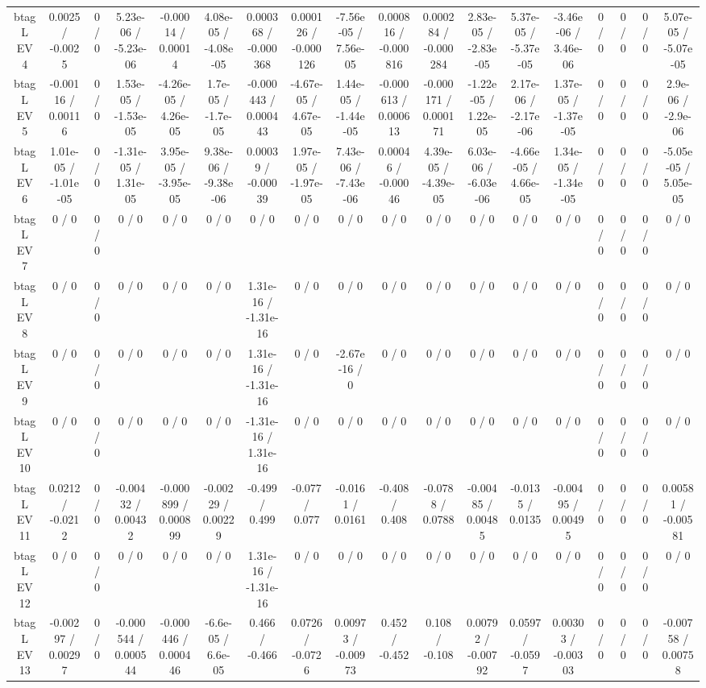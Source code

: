 \documentclass[10pt]{article}
\begin{document}
\begin{table}[htbp]
\begin{center}
\begin{tabular}{|c|c|c|c|c|c|c|c|c|c|c|c|c|c|c|c|c|c|}
  btag L EV 4 & 0.0025 / -0.0025 & 0 / 0 & 5.23e-06 / -5.23e-06 & -0.00014 / 0.00014 & 4.08e-05 / -4.08e-05 & 0.000368 / -0.000368 & 0.000126 / -0.000126 & -7.56e-05 / 7.56e-05 & 0.000816 / -0.000816 & 0.000284 / -0.000284 & 2.83e-05 / -2.83e-05 & 5.37e-05 / -5.37e-05 & -3.46e-06 / 3.46e-06 & 0 / 0 & 0 / 0 & 0 / 0 & 5.07e-05 / -5.07e-05 \\ 
  btag L EV 5 & -0.00116 / 0.00116 & 0 / 0 & 1.53e-05 / -1.53e-05 & -4.26e-05 / 4.26e-05 & 1.7e-05 / -1.7e-05 & -0.000443 / 0.000443 & -4.67e-05 / 4.67e-05 & 1.44e-05 / -1.44e-05 & -0.000613 / 0.000613 & -0.000171 / 0.000171 & -1.22e-05 / 1.22e-05 & 2.17e-06 / -2.17e-06 & 1.37e-05 / -1.37e-05 & 0 / 0 & 0 / 0 & 0 / 0 & 2.9e-06 / -2.9e-06 \\ 
  btag L EV 6 & 1.01e-05 / -1.01e-05 & 0 / 0 & -1.31e-05 / 1.31e-05 & 3.95e-05 / -3.95e-05 & 9.38e-06 / -9.38e-06 & 0.00039 / -0.00039 & 1.97e-05 / -1.97e-05 & 7.43e-06 / -7.43e-06 & 0.00046 / -0.00046 & 4.39e-05 / -4.39e-05 & 6.03e-06 / -6.03e-06 & -4.66e-05 / 4.66e-05 & 1.34e-05 / -1.34e-05 & 0 / 0 & 0 / 0 & 0 / 0 & -5.05e-05 / 5.05e-05 \\ 
  btag L EV 7 & 0 / 0 & 0 / 0 & 0 / 0 & 0 / 0 & 0 / 0 & 0 / 0 & 0 / 0 & 0 / 0 & 0 / 0 & 0 / 0 & 0 / 0 & 0 / 0 & 0 / 0 & 0 / 0 & 0 / 0 & 0 / 0 & 0 / 0 \\ 
  btag L EV 8 & 0 / 0 & 0 / 0 & 0 / 0 & 0 / 0 & 0 / 0 & 1.31e-16 / -1.31e-16 & 0 / 0 & 0 / 0 & 0 / 0 & 0 / 0 & 0 / 0 & 0 / 0 & 0 / 0 & 0 / 0 & 0 / 0 & 0 / 0 & 0 / 0 \\ 
  btag L EV 9 & 0 / 0 & 0 / 0 & 0 / 0 & 0 / 0 & 0 / 0 & 1.31e-16 / -1.31e-16 & 0 / 0 & -2.67e-16 / 0 & 0 / 0 & 0 / 0 & 0 / 0 & 0 / 0 & 0 / 0 & 0 / 0 & 0 / 0 & 0 / 0 & 0 / 0 \\ 
  btag L EV 10 & 0 / 0 & 0 / 0 & 0 / 0 & 0 / 0 & 0 / 0 & -1.31e-16 / 1.31e-16 & 0 / 0 & 0 / 0 & 0 / 0 & 0 / 0 & 0 / 0 & 0 / 0 & 0 / 0 & 0 / 0 & 0 / 0 & 0 / 0 & 0 / 0 \\ 
  btag L EV 11 & 0.0212 / -0.0212 & 0 / 0 & -0.00432 / 0.00432 & -0.000899 / 0.000899 & -0.00229 / 0.00229 & -0.499 / 0.499 & -0.077 / 0.077 & -0.0161 / 0.0161 & -0.408 / 0.408 & -0.0788 / 0.0788 & -0.00485 / 0.00485 & -0.0135 / 0.0135 & -0.00495 / 0.00495 & 0 / 0 & 0 / 0 & 0 / 0 & 0.00581 / -0.00581 \\ 
  btag L EV 12 & 0 / 0 & 0 / 0 & 0 / 0 & 0 / 0 & 0 / 0 & 1.31e-16 / -1.31e-16 & 0 / 0 & 0 / 0 & 0 / 0 & 0 / 0 & 0 / 0 & 0 / 0 & 0 / 0 & 0 / 0 & 0 / 0 & 0 / 0 & 0 / 0 \\ 
  btag L EV 13 & -0.00297 / 0.00297 & 0 / 0 & -0.000544 / 0.000544 & -0.000446 / 0.000446 & -6.6e-05 / 6.6e-05 & 0.466 / -0.466 & 0.0726 / -0.0726 & 0.00973 / -0.00973 & 0.452 / -0.452 & 0.108 / -0.108 & 0.00792 / -0.00792 & 0.0597 / -0.0597 & 0.00303 / -0.00303 & 0 / 0 & 0 / 0 & 0 / 0 & -0.00758 / 0.00758 \\ 

\end{tabular}
\end{center}
\end{table}
\end{document}
